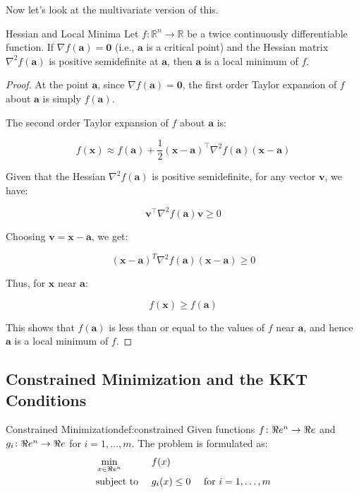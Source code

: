 Now let's look at the multivariate version of this.


\begin{lemma}{Hessian and Local Minima}{}
Let \( f\colon \mathbb{R}^n \rightarrow \mathbb{R} \) be a twice continuously differentiable function. If \( \nabla f(\mathbf{a}) = \mathbf{0} \) (i.e., \( \mathbf{a} \) is a critical point) and the Hessian matrix \( \nabla^2 f(\mathbf{a}) \) is positive semidefinite at \( \mathbf{a} \), then \( \mathbf{a} \) is a local minimum of \( f \).
\end{lemma}

\begin{proof}
At the point \( \mathbf{a} \), since \( \nabla f(\mathbf{a}) = \mathbf{0} \), the first order Taylor expansion of \( f \) about \( \mathbf{a} \) is simply \( f(\mathbf{a}) \).

The second order Taylor expansion of \( f \) about \( \mathbf{a} \) is:

\[
f(\mathbf{x}) \approx f(\mathbf{a}) + \frac{1}{2} (\mathbf{x}-\mathbf{a})^\top \nabla^2 f(\mathbf{a}) (\mathbf{x}-\mathbf{a})
\]

Given that the Hessian \( \nabla^2 f(\mathbf{a}) \) is positive semidefinite, for any vector \( \mathbf{v} \), we have:

\[
\mathbf{v}^\top \nabla^2 f(\mathbf{a}) \mathbf{v} \geq 0
\]

Choosing \( \mathbf{v} = \mathbf{x}-\mathbf{a} \), we get:

\[
(\mathbf{x}-\mathbf{a})^T \nabla^2 f(\mathbf{a}) (\mathbf{x}-\mathbf{a}) \geq 0
\]

Thus, for \( \mathbf{x} \) near \( \mathbf{a} \):

\[
f(\mathbf{x}) \geq f(\mathbf{a})
\]

This shows that \( f(\mathbf{a}) \) is less than or equal to the values of \( f \) near \( \mathbf{a} \), and hence \( \mathbf{a} \) is a local minimum of \( f \).
\end{proof}



\subsection{Constrained Minimization and the KKT Conditions}

 \begin{definition}{Constrained Minimization}{def:constrained}
        Given functions $f\colon \Re e^n \to \Re e$ and $g_i\colon \Re e^n \to \Re e$ for $i = 1, \dots, m$. The problem is formulated as:
        \begin{align*}
            &\min_{x \in \Re e^n} &&f(x) \\
            &\mbox{subject to } && g_i(x) \leq 0 &\mbox{ for } i=1, \dots, m
        \end{align*}
    \end{definition}
    


